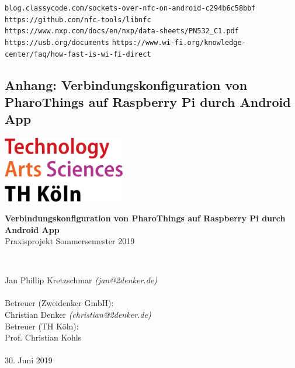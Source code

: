 \begin{thebibliography}{9}
        \texttt{blog.classycode.com/sockets-over-nfc-on-\linebreak android-c294b6c58bbf}
        \texttt{https://github.com/nfc-tools/libnfc}
        \texttt{https://www.nxp.com/docs/en/nxp/data-sheets/\linebreak PN532\_C1.pdf}
        \texttt{https://usb.org/documents}
        \texttt{https://www.wi-fi.org/knowledge-center/faq/\linebreak how-fast-is-wi-fi-direct}
    \end{thebibliography}
    \pagebreak
    \appendix
    \stopcontents

    \startcontents[sections]
    \begin{titlepage}
    \section{Anhang: Verbindungskonfiguration von PharoThings auf Raspberry Pi durch Android App}
    \includegraphics[width=0.4\textwidth]{../latex-ai-project/th_logo.png}
    ~\\[2.5cm]
    \begin{center}
    \textbf{\huge Verbindungskonfiguration von PharoThings auf Raspberry Pi durch Android App}\\[0.5cm]
    {\Large Praxisprojekt Sommersemester 2019}
    \vfill
    \end{center}
    ~\\[2.0cm]
    \begin{flushright}
    {\large Jan Phillip Kretzschmar \it{(jan@2denker.de)}}\\[0.1cm]
    ~\\[1.0cm]
    {\large Betreuer (Zweidenker GmbH):}\\[0.1cm]
    {\large Christian Denker \it{(christian@2denker.de)}}
    ~\\[0.5cm]
    {\large Betreuer (TH Köln):}\\[0.1cm]
    {\large Prof. Christian Kohls}\\[0.1cm]

	~\\[1.0cm]
    {\large 30. Juni 2019}
	\end{flushright}
    \end{titlepage}

